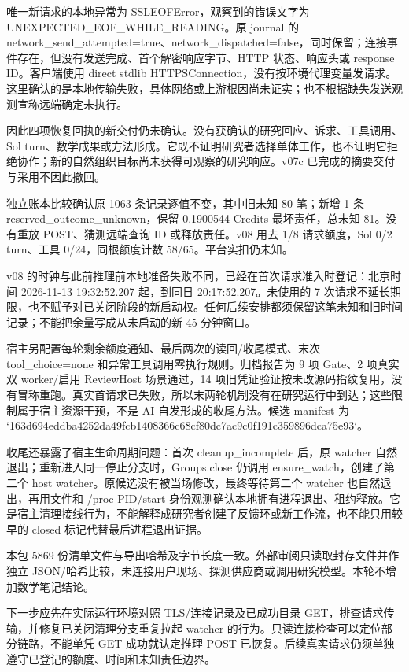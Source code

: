 唯一新请求的本地异常为 SSLEOFError，观察到的错误文字为 UNEXPECTED_EOF_WHILE_READING。原 journal 的 network_send_attempted=true、network_dispatched=false，同时保留；连接事件存在，但没有发送完成、首个解密响应字节、HTTP 状态、响应头或 response ID。客户端使用 direct stdlib HTTPSConnection，没有按环境代理变量发请求。这里确认的是本地传输失败，具体网络或上游根因尚未证实；也不根据缺失发送观测宣称远端确定未执行。

因此四项恢复回执的新交付仍未确认。没有获确认的研究回应、诉求、工具调用、Sol turn、数学成果或方法形成。它既不证明研究者选择单体工作，也不证明它拒绝协作；新的自然组织目标尚未获得可观察的研究响应。v07c 已完成的摘要交付与采用不因此撤回。

独立账本比较确认原 1063 条记录逐值不变，其中旧未知 80 笔；新增 1 条 reserved_outcome_unknown，保留 0.1900544 Credits 最坏责任，总未知 81。没有重放 POST、猜测远端查询 ID 或释放责任。v08 用去 1/8 请求额度，Sol 0/2 turn、工具 0/24，同根额度计数 58/65。平台实扣仍未知。

v08 的时钟与此前推理前本地准备失败不同，已经在首次请求准入时登记：北京时间 2026-11-13 19:32:52.207 起，到同日 20:17:52.207。未使用的 7 次请求不延长期限，也不赋予对已关闭阶段的新启动权。任何后续安排都须保留这笔未知和旧时间记录；不能把余量写成从未启动的新 45 分钟窗口。

宿主另配置每轮剩余额度通知、最后两次的读回/收尾模式、末次 tool_choice=none 和异常工具调用零执行规则。归档报告为 9 项 Gate、2 项真实双 worker/启用 ReviewHost 场景通过，14 项旧凭证验证按未改源码指纹复用，没有冒称重跑。真实首请求已失败，所以末两轮机制没有在研究运行中到达；这些限制属于宿主资源干预，不是 AI 自发形成的收尾方法。候选 manifest 为 `163d694eddba4252da49fcb1408366c68cf80dc7ac9c0f191c359896dca75e93`。

收尾还暴露了宿主生命周期问题：首次 cleanup_incomplete 后，原 watcher 自然退出；重新进入同一停止分支时，Groups.close 仍调用 ensure_watch，创建了第二个 host watcher。原候选没有被当场修改，最终等待第二个 watcher 也自然退出，再用文件和 /proc PID/start 身份观测确认本地拥有进程退出、租约释放。它是宿主清理接线行为，不能解释成研究者创建了反馈环或新工作流，也不能只用较早的 closed 标记代替最后进程退出证据。

本包 5869 份清单文件与导出哈希及字节长度一致。外部审阅只读取封存文件并作独立 JSON/哈希比较，未连接用户现场、探测供应商或调用研究模型。本轮不增加数学笔记结论。

下一步应先在实际运行环境对照 TLS/连接记录及已成功目录 GET，排查请求传输，并修复已关闭清理分支重复拉起 watcher 的行为。只读连接检查可以定位部分链路，不能单凭 GET 成功就认定推理 POST 已恢复。后续真实请求仍须单独遵守已登记的额度、时间和未知责任边界。


